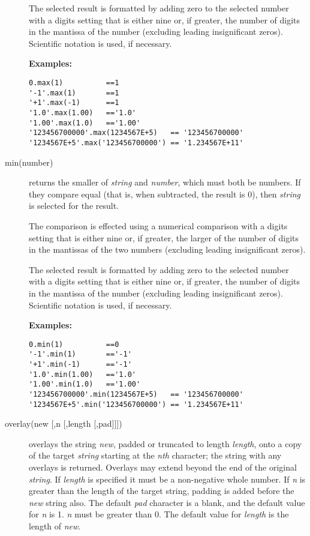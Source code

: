 \begin{description}
The selected result is formatted by adding zero to the selected number
with a digits setting that is either nine or, if greater, the number of
digits in the mantissa of the number (excluding leading insignificant
zeros).
Scientific notation is used, if necessary.
 
\textbf{Examples:}
\begin{lstlisting}
0.max(1)          ==1
'-1'.max(1)       ==1
'+1'.max(-1)      ==1
'1.0'.max(1.00)   =='1.0'
'1.00'.max(1.0)   =='1.00'
'123456700000'.max(1234567E+5)   == '123456700000'
'1234567E+5'.max('123456700000') == '1.234567E+11'
\end{lstlisting}

\item[min(number)]\label{refmin}

returns the smaller of \emph{string} and \emph{number}, which
must both be numbers.  If they compare equal (that is, when subtracted,
the result is 0), then \emph{string} is selected for the result.
 
The comparison is effected using a numerical comparison with a digits
setting that is either nine or, if greater, the larger of the number of
digits in the mantissas of the two numbers (excluding leading
insignificant zeros).
 
The selected result is formatted by adding zero to the selected number
with a digits setting that is either nine or, if greater, the number of
digits in the mantissa of the number (excluding leading insignificant
zeros).
Scientific notation is used, if necessary.
 
\textbf{Examples:}
\begin{lstlisting}
0.min(1)          ==0
'-1'.min(1)       =='-1'
'+1'.min(-1)      =='-1'
'1.0'.min(1.00)   =='1.0'
'1.00'.min(1.0)   =='1.00'
'123456700000'.min(1234567E+5)   == '123456700000'
'1234567E+5'.min('123456700000') == '1.234567E+11'
\end{lstlisting}

\item[overlay(new [,n [,length [,pad{]]]})]\label{refoverlay}
overlays the string \emph{new}, padded or truncated to length
\emph{length}, onto a copy of the target \emph{string} starting
at the \emph{n}\emph{th} character; the string with any overlays is
returned.  Overlays may extend beyond the end of the original
\emph{string}.
If \emph{length} is specified it must be a non-negative whole
number.
If \emph{n} is greater than the length of
the target string, padding is added before the \emph{new} string
also.
The default \emph{pad} character is a blank, and the default value
for \emph{n} is 1.
\emph{n} must be greater than 0.
The default value for \emph{length} is the length of \emph{new}.
 

\end{description}
